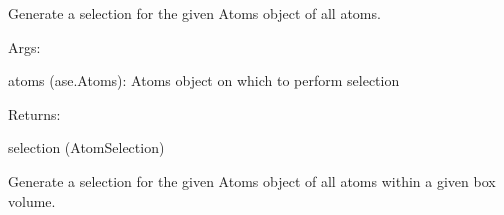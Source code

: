 \documentclass[letterpaper,10pt,english]{sphinxmanual}
\begin{document}
\begin{fulllineitems}
\begin{fulllineitems}
\label{doctree/soprano.selection:soprano.selection.AtomSelection.all}
Generate a selection for the given Atoms object of all atoms.

\begin{DUlineblock}{0em}
\item[] Args:
\item[]
\begin{DUlineblock}{\DUlineblockindent}
\item[] atoms (ase.Atoms): Atoms object on which to perform selection
\end{DUlineblock}
\end{DUlineblock}

\begin{DUlineblock}{0em}
\item[] Returns:
\item[]
\begin{DUlineblock}{\DUlineblockindent}
\item[] selection (AtomSelection)
\end{DUlineblock}
\end{DUlineblock}

\end{fulllineitems}


\begin{fulllineitems}
\label{doctree/soprano.selection:soprano.selection.AtomSelection.from_box}
Generate a selection for the given Atoms object of all atoms within
a given box volume.


\end{fulllineitems}
\end{fulllineitems}
\end{document}

